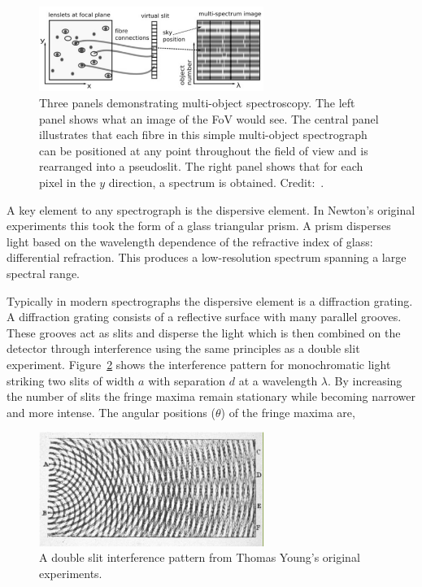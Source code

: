 \begin{figure}
 \centering
 \includegraphics[width=0.65\textwidth]{kmos/Lawrence-multi-object}
 \caption[Multi-object Spectroscopy]{Three panels demonstrating multi-object spectroscopy.
 The left panel shows what an image of the FoV would see.
 The central panel illustrates that each fibre in this simple multi-object spectrograph can be positioned at any point throughout the field of view and is rearranged into a pseudoslit.
 The right panel shows that for each pixel in the $y$ direction, a spectrum is obtained.
 Credit:~\cite{2014amcg.book.....L}.
 \label{fig:long-slit}}
\end{figure}

A key element to any spectrograph is the dispersive element.
In Newton's original experiments this took the form of a glass triangular prism.
A prism disperses light based on the wavelength dependence of the refractive index of glass: differential refraction.
This produces a low-resolution spectrum spanning a large spectral range.

Typically in modern spectrographs the dispersive element is a diffraction grating.
A diffraction grating consists of a reflective surface with many parallel grooves.
These grooves act as slits and disperse the light which is then combined on the detector through interference using the same principles as a double slit experiment.
Figure~\ref{fig:doubleslit} shows the interference pattern for monochromatic light striking two slits of width $a$ with separation $d$ at a wavelength $\lambda$.
By increasing the number of slits the fringe maxima remain stationary while becoming narrower and more intense.
The angular positions ($\theta$) of the fringe maxima are,


\begin{figure}
 \centering
 \includegraphics[width=0.65\textwidth]{kmos/youngslits}
 \caption[Double slit interference pattern]{A double slit interference pattern from Thomas Young's original experiments.
 \label{fig:doubleslit}}
\end{figure}


